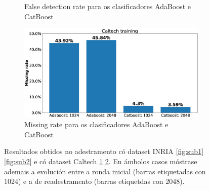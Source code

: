\documentclass[galician]{./head/uvigo-tfg}
\begin{document}
\begin{figure}
\begin{subfigure}{.475\textwidth}
          \caption{False detection rate para os clasificadores AdaBoost e CatBoost}
          \label{fig:sub3}
        \end{subfigure}
        \begin{subfigure}{.475\textwidth}
          \centering
          \includegraphics[width=1.1\linewidth]{figures/caltech_missing_rate.eps}
          \caption{Missing rate para os clasificadores AdaBoost e CatBoost}
          \label{fig:sub4}
        \end{subfigure}
        \caption{Resultados obtidos no adestramento có dataset INRIA \ref{fig:sub1} \ref{fig:sub2} e có dataset Caltech \ref{fig:sub3} \ref{fig:sub4}. En ámbolos casos móstrase ademais a evolución entre a ronda inicial (barras etiquetadas con 1024) e a de readestramento (barras etiquetdas con 2048).}
        \label{fig:results}
    \end{figure}
    
\end{document}

